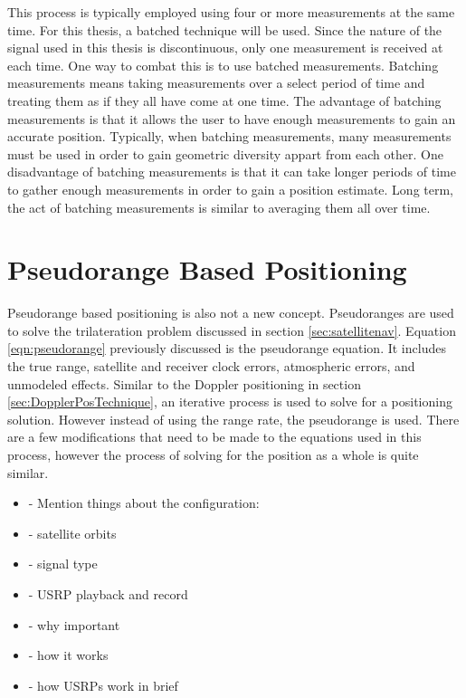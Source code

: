 \documentclass[12pt]{report}
\begin{document}
This process is typically employed using four or more measurements at the same time. For this thesis, a batched technique will be used. Since the nature of the signal used in this thesis is discontinuous, only one measurement is received at each time. One way to combat this is to use batched measurements. Batching measurements means taking measurements over a select period of time and treating them as if they all have come at one time. The advantage of batching measurements is that it allows the user to have enough measurements to gain an accurate position. Typically, when batching measurements, many measurements must be used in order to gain geometric diversity appart from each other. One disadvantage of batching measurements is that it can take longer periods of time to gather enough measurements in order to gain a position estimate. Long term, the act of batching measurements is similar to averaging them all over time. 

\section{Pseudorange Based Positioning} \label{sec:PseudorangePosTechnique}
Pseudorange based positioning is also not a new concept. Pseudoranges are used to solve the trilateration problem discussed in section \ref{sec:satellitenav}. Equation \ref{eqn:pseudorange} previously discussed is the pseudorange equation. It includes the true range, satellite and receiver clock errors, atmospheric errors, and unmodeled effects. Similar to the Doppler positioning in section \ref{sec:DopplerPosTechnique}, an iterative process is used to solve for a positioning solution. However instead of using the range rate, the pseudorange is used. There are a few modifications that need to be made to the equations used in this process, however the process of solving for the position as a whole is quite similar. 
\begin{itemize}
    \item     - Mention things about the configuration:
    \item     - satellite orbits
    \item     - signal type
    \item     - USRP playback and record
    \item     - why important
    \item     - how it works
    \item     - how USRPs work in brief

\end{itemize}
\end{document}
